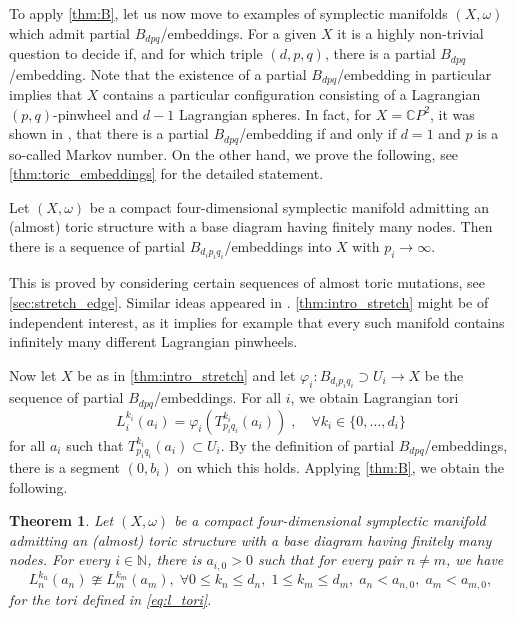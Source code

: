 \documentclass[AIF,Unicode,manuscript]{cedram}
\newtheorem{maintheorem}{Theorem}
\begin{document}
To apply \cref{thm:B}, let us now move to examples of symplectic manifolds $(X,\omega)$ which admit partial $B_{dpq}$\-/embeddings.
For a given $X$ it is a highly non-trivial question to decide if, and for which triple $(d,p,q)$, there is a partial $B_{dpq}$\-/embedding.
Note that the existence of a partial $B_{dpq}$\-/embedding in particular implies that $X$ contains a particular configuration consisting of a Lagrangian $(p,q)$-pinwheel and $d-1$ Lagrangian spheres.
In fact, for $X = \mathbb{C}P^2$, it was shown in \cite{EvaSmi18}, that there is a partial $B_{dpq}$\-/embedding if and only if $d=1$ and $p$ is a so-called Markov number.
On the other hand, we prove the following, see \cref{thm:toric_embeddings} for the detailed statement.

\begin{proposition}
    \label{thm:intro_stretch}
  Let $(X,\omega)$ be a compact four-dimensional symplectic manifold admitting an (almost) toric structure with a base diagram having finitely many nodes.
Then there is a sequence of partial $B_{d_i p_i q_i}$\-/embeddings into $X$ with $p_i \rightarrow \infty$. 
\end{proposition}

This is proved by considering certain sequences of almost toric mutations, see \cref{sec:stretch_edge}.
Similar ideas appeared in \cite{EvaUrz21}.
\cref{thm:intro_stretch} might be of independent interest, as it implies for example that every such manifold contains infinitely many different Lagrangian pinwheels. 

Now let $X$ be as in \cref{thm:intro_stretch} and let $\varphi_i \colon B_{d_i p_i q_i} \supset U_i \rightarrow X$ be the sequence of partial $B_{dpq}$\-/embeddings.
For all $i$, we obtain Lagrangian tori
\begin{equation}
    \label{eq:l_tori}
    L^{k_i}_i(a_i) = \varphi_i(T^{k_i}_{p_i q_i}(a_i))\;, \quad
    \forall k_i \in \{0,\ldots,d_i\}
\end{equation}
for all $a_i$ such that $T^{k_i}_{p_i q_i}(a_i) \subset U_i$.
By the definition of partial $B_{dpq}$\-/embeddings, there is a segment $(0,b_i)$ on which this holds.
Applying \cref{thm:B}, we obtain the following.
   

\begin{maintheorem}
    \label{thm:C}
    Let $(X,\omega)$ be a compact four-dimensional symplectic manifold admitting an (almost) toric structure with a base diagram having finitely many nodes.
For every $i \in \mathbb{N}$, there is $a_{i,0} > 0$ such that for every pair $n \neq m$, we have
    \begin{equation}
        L^{k_n}_n(a_n) \ncong L^{k_m}_m(a_m), \;
        \forall 0 ≤ k_n ≤ d_n,\; 1 ≤ k_m ≤ d_m, \; a_n < a_{n,0}, \; a_m < a_{m,0},
    \end{equation}
    for the tori defined in \eqref{eq:l_tori}.
\end{maintheorem}
\end{document}
